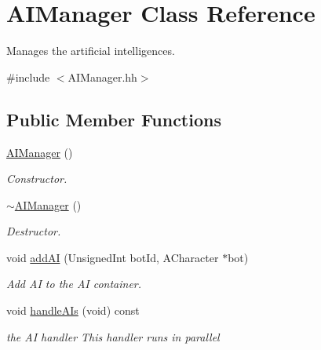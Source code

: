 \hypertarget{classAIManager}{}\section{A\+I\+Manager Class Reference}
\label{classAIManager}


Manages the artificial intelligences.  




{\ttfamily \#include $<$A\+I\+Manager.\+hh$>$}

\subsection*{Public Member Functions}
\begin{DoxyCompactItemize}
\item 
\mbox{\label{classAIManager_a02d9effe0270bd2a353acdf45f11b360}} 
\hyperlink{classAIManager_a02d9effe0270bd2a353acdf45f11b360}{A\+I\+Manager} ()
\begin{DoxyCompactList}\small\item\em Constructor. \end{DoxyCompactList}\item 
\mbox{\label{classAIManager_a07762cbbf5de6bffd7499f86987a8dd5}} 
\hyperlink{classAIManager_a07762cbbf5de6bffd7499f86987a8dd5}{$\sim$\+A\+I\+Manager} ()
\begin{DoxyCompactList}\small\item\em Destructor. \end{DoxyCompactList}\item 
void \hyperlink{classAIManager_aa50f2de11ad8c59ec56a505579565165}{add\+AI} (Unsigned\+Int bot\+Id, A\+Character $\ast$bot)
\begin{DoxyCompactList}\small\item\em Add AI to the AI container. \end{DoxyCompactList}\item 
\mbox{\label{classAIManager_a2222883bde2aaa534202f2bf1366e18d}} 
void \hyperlink{classAIManager_a2222883bde2aaa534202f2bf1366e18d}{handle\+A\+Is} (void) const
\begin{DoxyCompactList}\small\item\em the AI handler This handler runs in parallel \end{DoxyCompactList}\end{DoxyCompactItemize}


